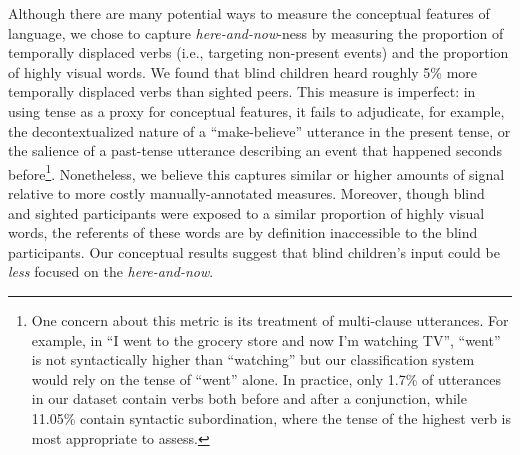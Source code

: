 \documentclass[
  man,floatsintext]{apa6}
\begin{document}
Although there are many potential ways to measure the conceptual features of language, we chose to capture \emph{here-and-now}-ness by measuring the proportion of temporally displaced verbs (i.e., targeting non-present events) and the proportion of highly visual words. We found that blind children heard roughly 5\% more temporally displaced verbs than sighted peers. This measure is imperfect: in using tense as a proxy for conceptual features, it fails to adjudicate, for example, the decontextualized nature of a ``make-believe'' utterance in the present tense, or the salience of a past-tense utterance describing an event that happened seconds before\footnote{One concern about this metric is its treatment of multi-clause utterances. For example, in ``I went to the grocery store and now I'm watching TV'', ``went'' is not syntactically higher than ``watching'' but our classification system would rely on the tense of ``went'' alone. In practice, only 1.7\% of utterances in our dataset contain verbs both before and after a conjunction, while 11.05\% contain syntactic subordination, where the tense of the highest verb is most appropriate to assess.}. Nonetheless, we believe this captures similar or higher amounts of signal relative to more costly manually-annotated measures. Moreover, though blind and sighted participants were exposed to a similar proportion of highly visual words, the referents of these words are by definition inaccessible to the blind participants. Our conceptual results suggest that blind children's input could be \emph{less} focused on the \emph{here-and-now}.
\end{document}
